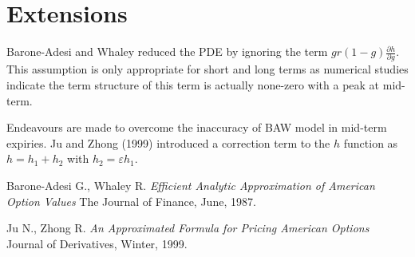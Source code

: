 \documentclass{article}
\begin{document}
\section{Extensions}

Barone-Adesi and Whaley reduced the PDE by ignoring the term $ g r \left(1 - g\right) \frac{\partial h}{\partial g} $.
This assumption is only appropriate for short and long terms as numerical studies indicate the term structure of this term is actually none-zero with a peak at mid-term.

Endeavours are made to overcome the inaccuracy of BAW model in mid-term expiries.
Ju and Zhong (1999) introduced a correction term to the $ h $ function as $ h = h_1 + h_2 $ with $ h_2 = \varepsilon h_1 $.


\begin{thebibliography}{9}
    Barone-Adesi G., Whaley R.
    \textit{Efficient Analytic Approximation of American Option Values}
    The Journal of Finance, June, 1987.
    
    Ju N., Zhong R.
    \textit{An Approximated Formula for Pricing American Options}
    Journal of Derivatives, Winter, 1999.
\end{thebibliography}
\end{document}
